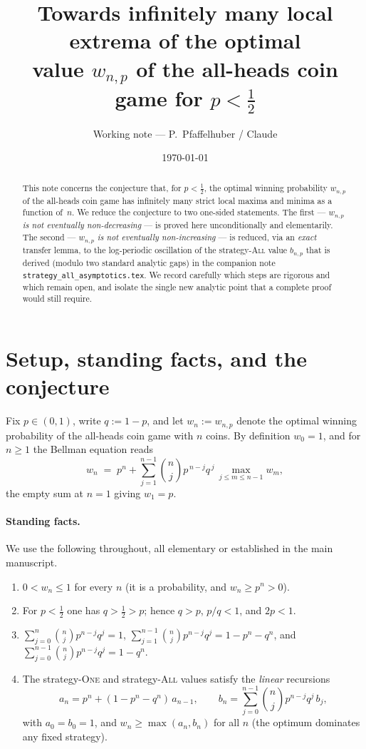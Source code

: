 \documentclass[11pt]{article}
\title{Towards infinitely many local extrema of the optimal\\
  value $w_{n,p}$ of the all-heads coin game for $p<\tfrac12$}
\author{Working note --- P.\ Pfaffelhuber / Claude}
\date{\today}
\theoremstyle{definition}
\newcommand{\One}{\textsc{One}}
\newcommand{\All}{\textsc{All}}
\begin{document}
\maketitle

\begin{abstract}
  This note concerns the conjecture that, for $p<\tfrac12$, the optimal
  winning probability $w_{n,p}$ of the all-heads coin game has
  infinitely many strict local maxima and minima as a function
  of~$n$. We reduce the conjecture to two one-sided statements.
  The first --- \emph{$w_{n,p}$ is not eventually non-decreasing} ---
  is proved here unconditionally and elementarily. The second ---
  \emph{$w_{n,p}$ is not eventually non-increasing} --- is reduced, via
  an \emph{exact} transfer lemma, to the log-periodic oscillation of
  the strategy-\All{} value $b_{n,p}$ that is derived (modulo two
  standard analytic gaps) in the companion note
  \texttt{strategy\_all\_asymptotics.tex}. We record carefully which
  steps are rigorous and which remain open, and isolate the single new
  analytic point that a complete proof would still require.
\end{abstract}

\section{Setup, standing facts, and the conjecture}\label{sec:setup}

Fix $p\in(0,1)$, write $q:=1-p$, and let $w_n:=w_{n,p}$ denote the
optimal winning probability of the all-heads coin game with $n$ coins.
By definition $w_0=1$, and for $n\ge 1$ the Bellman equation reads
\begin{equation}\label{eq:bellman}
  w_n \;=\; p^n + \sum_{j=1}^{n-1}\binom{n}{j}p^{\,n-j}q^{\,j}\,
  \max_{j\le m\le n-1} w_m ,
\end{equation}
the empty sum at $n=1$ giving $w_1=p$.

\paragraph{Standing facts.} We use the following throughout, all
elementary or established in the main manuscript.
\begin{enumerate}[label=(F\arabic*),leftmargin=3.2em]
\item\label{f:bounds} $0<w_n\le 1$ for every $n$ (it is a probability,
  and $w_n\ge p^n>0$).
\item\label{f:pq} For $p<\tfrac12$ one has $q>\tfrac12>p$; hence
  $q>p$, $p/q<1$, and $2p<1$.
\item\label{f:binom} $\displaystyle\sum_{j=0}^{n}\binom nj p^{n-j}q^j=1$,
  $\displaystyle\sum_{j=1}^{n-1}\binom nj p^{n-j}q^j=1-p^n-q^n$, and
  $\displaystyle\sum_{j=0}^{n-1}\binom nj p^{n-j}q^j=1-q^n$.
\item\label{f:strat} The strategy-\One{} and strategy-\All{} values
  satisfy the \emph{linear} recursions
  \[
    a_n = p^n+(1-p^n-q^n)\,a_{n-1},\qquad
    b_n = \sum_{j=0}^{n-1}\binom nj p^{n-j}q^j\,b_j ,
  \]
  with $a_0=b_0=1$, and $w_n\ge\max(a_n,b_n)$ for all $n$ (the optimum
  dominates any fixed strategy).
\end{enumerate}
\end{document}
